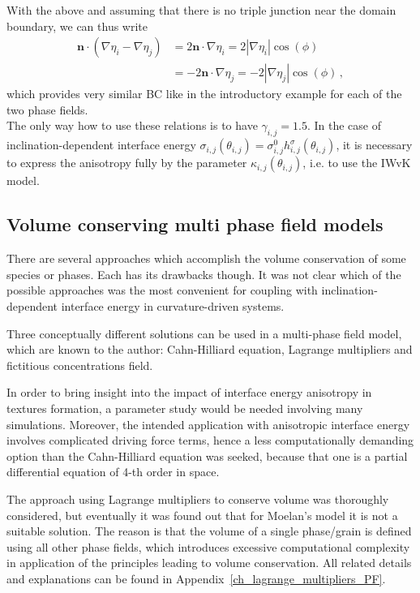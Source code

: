 	With the above and assuming that there is no triple junction near the domain boundary, we can thus write
	\begin{equation}
		\begin{split}
			\bm{n}\cdot(\nabla\eta_i-\nabla\eta_j) &= 2\bm{n}\cdot\nabla\eta_i = 2|\nabla\eta_i|\cos(\phi) \\ &= -2\bm{n}\cdot\nabla\eta_j = -2|\nabla\eta_j|\cos(\phi) \,,
		\end{split}
	\end{equation}
	which provides very similar BC like in the introductory example for each of the two phase fields.\\
	The only way how to use these relations is to have $\gamma_{i,j}=1.5$. In the case of inclination-dependent interface energy $\sigma_{i,j}(\theta_{i,j})=\sigma_{i,j}^0h_{i,j}^\sigma(\theta_{i,j})$, it is necessary to express the anisotropy fully by the parameter $\kappa_{i,j}(\theta_{i,j})$, i.e. to use the IWvK model.
	
	\subsection{Volume conserving multi phase field models}\label{sec_volume_cons_PF_ch_NPA_PF}
	There are several approaches which accomplish the volume conservation of some species or phases. Each has its drawbacks though. It was not clear which of the possible approaches was the most convenient for coupling with inclination-dependent interface energy in curvature-driven systems.
	
	Three conceptually different solutions can be used in a multi-phase field model, which are known to the author: Cahn-Hilliard equation, Lagrange multipliers and fictitious concentrations field. 
	
	In order to bring insight into the impact of interface energy anisotropy in textures formation, a parameter study would be needed involving many simulations. Moreover, the intended application with anisotropic interface energy involves complicated driving force terms, hence a less computationally demanding option than the Cahn-Hilliard equation was seeked, because that one is a partial differential equation of 4-th order in space. 
	
	The approach using Lagrange multipliers to conserve volume was thoroughly considered, but eventually it was found out that for Moelan's model it is not a suitable solution. The reason is that the volume of a single phase/grain is defined using all other phase fields, which introduces excessive computational complexity in application of the principles leading to volume conservation. All related details and explanations can be found in Appendix~\ref{ch_lagrange_multipliers_PF}.
	
